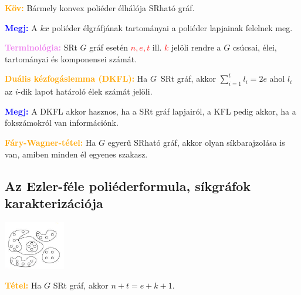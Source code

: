 \documentclass[../szamtud.tex]{subfiles}
\begin{document}
        \textcolor{orange}{\textbf{Köv:}} Bármely konvex poliéder élhálója SRható gráf.


        \textcolor{blue}{\textbf{Megj:}} A $kx$ poliéder élgráfjának tartományai a poliéder lapjainak felelnek meg.

        \textcolor{violet}{\textbf{Terminológia:}} SRt $G$ gráf esetén \textcolor{red}{$n, e, t$} ill. \textcolor{red}{$k$} jelöli rendre a $G$ csúcsai, élei, tartományai és komponensei számát.

        \textcolor{orange}{\textbf{Duális kézfogáslemma (DKFL):}} Ha $G$ SRt gráf, akkor $\sum_{i=1}^{t} l_i=2e$ ahol $l_i$ az $i$-dik lapot határoló élek számát jelöli.


        \textcolor{blue}{\textbf{Megj:}} A DKFL akkor hasznos, ha a SRt gráf lapjairól, a KFL pedig akkor, ha a fokszámokról van információnk.

        \textcolor{orange}{\textbf{Fáry-Wagner-tétel:}} Ha $G$ egyerű SRható gráf, akkor olyan síkbarajzolása is van, amiben minden él egyenes szakasz.

    \subsection{Az Ezler-féle poliéderformula, síkgráfok karakterizációja}

        \includegraphics[width=0.2\textwidth]{./img/1.png}

        \textcolor{orange}{\textbf{Tétel:}} Ha $G$ SRt gráf, akkor $n+t=e+k+1$. 

\end{document}
